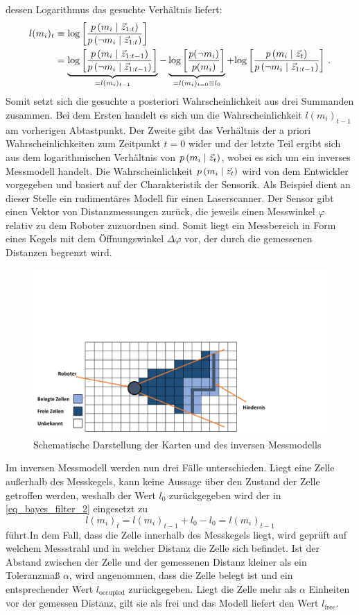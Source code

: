 dessen Logarithmus das gesuchte Verhältnis liefert:
\begin{equation}
\label{eq_bayes_filter_2}
\begin{split}
l(m_i)_t &\equiv \text{log}\left[ { \frac{p\left({m_i} \hspace{1mm} \vert \hspace{1mm} {\vec{z}_{1:t}}\right)}{p\left({\neg m_i} \hspace{1mm} \vert \hspace{1mm} {\vec{z}_{1:t}}\right)} } \right]  \\
&= \underbrace{\text{log}\left[ { \frac{p\left({m_i} \hspace{1mm} \vert \hspace{1mm} {\vec{z}_{1:t-1}}\right)}{p\left({\neg m_i} \hspace{1mm} \vert \hspace{1mm} {\vec{z}_{1:t-1}}\right)} } \right]}_{= l(m_i)_{t-1}} 
- \underbrace{ \text{log}\left[ { \frac{p(\neg m_i)}{p(m_i)} } \right] }_{=l(m_i)_{t=0}\equiv l_0}
 + \text{log}\left[ { \frac{p\left({m_i} \hspace{1mm} \vert \hspace{1mm} {\vec{z}_t}\right)}{p\left({\neg m_i} \hspace{1mm} \vert \hspace{1mm} {\vec{z}_{1:t-1}}\right)} } \right]\,.
\end{split}
\end{equation}
Somit setzt sich die gesuchte a posteriori Wahrscheinlichkeit aus drei Summanden zusammen. Bei dem Ersten handelt es sich um die Wahrscheinlichkeit $l(m_i)_{t-1}$ am vorherigen Abtastpunkt. Der Zweite gibt das Verhältnis der a priori Wahrscheinlichkeiten zum Zeitpunkt $t=0$ wider und der letzte Teil ergibt sich aus dem logarithmischen Verhältnis von $p\left({m_i} \hspace{1mm} \vert \hspace{1mm} {\vec{z}_t}\right)$, wobei es sich um ein inverses Messmodell handelt. Die Wahrscheinlichkeit $p\left({m_i} \hspace{1mm} \vert \hspace{1mm} {\vec{z}_t}\right)$ wird von dem Entwickler vorgegeben und basiert auf der Charakteristik der Sensorik.
Als Beispiel dient an dieser Stelle ein rudimentäres Modell für einen Laserscanner. Der Sensor gibt einen Vektor von Distanzmessungen zurück, die jeweils einen Messwinkel $\varphi$ relativ zu dem Roboter zuzuordnen sind. Somit liegt ein Messbereich in Form eines Kegels mit dem Öffnungswinkel $\Delta \varphi$ vor, der durch die gemessenen Distanzen begrenzt wird.
\begin{figure}[!ht]
\centering
\includegraphics[width=0.7\linewidth, trim={0cm 0cm 7cm 8cm}, clip]{img/Bilder_Karten_InvSensModel_1}
\caption{Schematische Darstellung der Karten und des inversen Messmodells}
\end{figure}
Im inversen Messmodell werden nun drei Fälle unterschieden. Liegt eine Zelle außerhalb des Messkegels, kann keine Aussage über den Zustand der Zelle getroffen werden, weshalb der Wert $l_0$ zurückgegeben wird der in \ref{eq_bayes_filter_2} eingesetzt zu 
\begin{equation}
l(m_i)_t = l(m_i)_{t-1} + l_0 - l_0 = l(m_i)_{t-1}
\end{equation}
führt.In dem Fall, dass die Zelle innerhalb des Messkegels liegt, wird geprüft auf welchem Messstrahl und in welcher Distanz die Zelle sich befindet. Ist der Abstand zwischen der Zelle und der gemessenen Distanz kleiner als ein Toleranzmaß $\alpha$, wird angenommen, dass die Zelle belegt ist und ein entsprechender Wert $l_{\text{occupied}}$ zurückgegeben. Liegt die Zelle mehr als $\alpha$ Einheiten vor der gemessen Distanz, gilt sie als frei und das Modell liefert den Wert $l_{\text{free}}$.